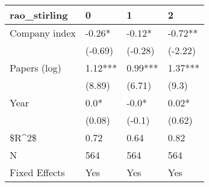 \begin{tabular}{llll}
\toprule
  rao\_stirling &        0 &        1 &        2 \\
\midrule
 Company index &   -0.26* &   -0.12* &  -0.72** \\
               &  (-0.69) &  (-0.28) &  (-2.22) \\
  Papers (log) &  1.12*** &  0.99*** &  1.37*** \\
               &   (8.89) &   (6.71) &    (9.3) \\
          Year &     0.0* &    -0.0* &    0.02* \\
               &   (0.08) &   (-0.1) &   (0.62) \\
         \$R\textasciicircum 2\$ &     0.72 &     0.64 &     0.82 \\
             N &      564 &      564 &      564 \\
 Fixed Effects &      Yes &      Yes &      Yes \\
\bottomrule
\end{tabular}
